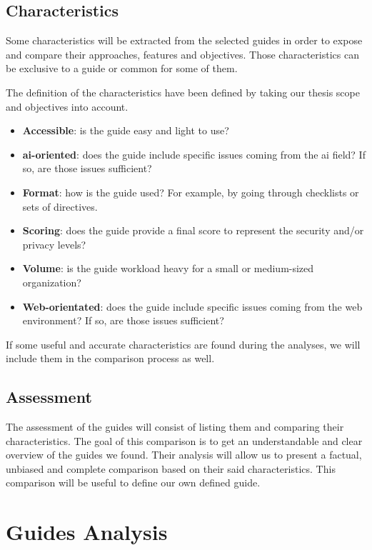 \subsection{Characteristics}
\label{subsec:comparison_characteristics}

Some characteristics will be extracted from the selected guides in order to expose and compare their approaches, features and objectives. Those characteristics can be exclusive to a guide or common for some of them. 

The definition of the characteristics have been defined by taking our thesis scope and objectives into account.
\begin{itemize}
    \item \textbf{Accessible}: is the guide easy and light to use?
    \item \textbf{\gls{ai}-oriented}: does the guide include specific issues coming from the \gls{ai} field? If so, are those issues sufficient?
    \item \textbf{Format}: how is the guide used? For example, by going through checklists or sets of directives.
    \item \textbf{Scoring}: does the guide provide a final score to represent the security and/or privacy levels?
    \item \textbf{Volume}: is the guide workload heavy for a small or medium-sized organization?
    \item \textbf{Web-orientated}: does the guide include specific issues coming from the web environment? If so, are those issues sufficient?
\end{itemize}

If some useful and accurate characteristics are found during the analyses, we will include them in the comparison process as well.

\subsection{Assessment}
\label{subsec:comparison_assessment}

The assessment of the guides will consist of listing them and comparing their characteristics. The goal of this comparison is to get an understandable and clear overview of the guides we found. Their analysis will allow us to present a factual, unbiased and complete comparison based on their said characteristics. This comparison will be useful to define our own defined guide.

\section{Guides Analysis}
\label{sec:comparison_analyse}

